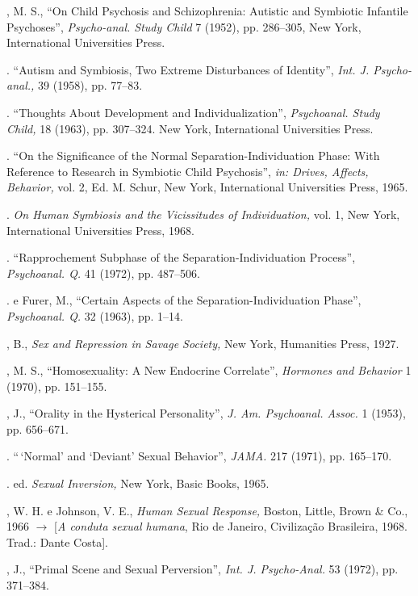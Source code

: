 \begin{description}
, M. S., ``On Child Psychosis and Schizophrenia: Autistic
and Symbiotic Infantile Psychoses'', \textit{Psycho-anal. Study
Child }7 (1952), pp. 286--305, New York, International Universities Press.

. ``Autism and Symbiosis, Two Extreme Disturbances
of Identity'', \textit{Int. J. Psycho-anal., }39 (1958), pp. 77--83.

. ``Thoughts About Development and
Individualization'', \textit{Psychoanal. Study Child, }18 (1963), pp.
307--324. New York, International Universities Press.

. ``On the Significance of the Normal
Separation-Individuation Phase: With Reference to Research in Symbiotic Child
Psychosis'', \textit{in: Drives, Affects, Behavior, }vol. 2, Ed. M.
Schur, New York, International Universities Press, 1965.

. \textit{On Human Symbiosis and the Vicissitudes of
Individuation, }vol. 1, New York, International Universities Press, 1968.

. ``Rapprochement Subphase of the
Separation-Individuation Process'', \textit{Psychoanal. Q. }41
(1972), pp. 487--506.

. e Furer, M., ``Certain Aspects of the
Separation-Individuation Phase'', \textit{Psychoanal. Q. }32 (1963),
pp. 1--14.

, B., \textit{Sex and Repression in Savage Society, }New York,
Humanities Press, 1927.

, M. S., ``Homosexuality: A New Endocrine
Correlate'', \textit{Hormones and Behavior }1 (1970), pp. 151--155.

, J., ``Orality in the Hysterical
Personality'', \textit{ J. Am. Psychoanal. Assoc. }1 (1953), pp.
656--671.

. ``\,`Normal' and `Deviant' Sexual Behavior'',
\textit{JAMA. }217 (1971), pp. 165--170.

. ed. \textit{Sexual Inversion, }New York, Basic Books, 1965.

, W. H. e Johnson, V. E., \textit{Human Sexual Response, }Boston,
Little, Brown \& Co., 1966 {$\bm{\rightarrow}$} [\textit{A conduta sexual humana}, Rio de Janeiro,
Civilização Brasileira, 1968. Trad.: Dante Costa].

, J., ``Primal Scene and Sexual
Perversion'', \textit{Int. J. Psycho-Anal. }53 (1972), pp. 371--384.


\end{description}
